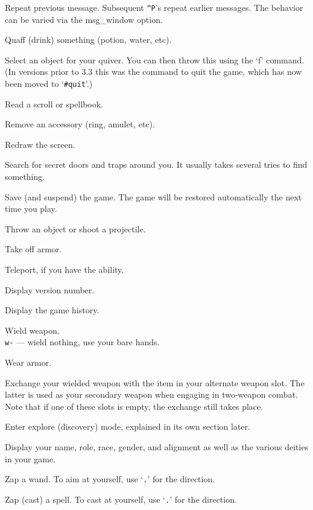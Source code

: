 \item[\tb{\^{}P}]
Repeat previous message.  Subsequent {\tt \^{}P}'s repeat earlier messages.
The behavior can be varied via the msg_window option.
\item[\tb{q}]
Quaff (drink) something (potion, water, etc).
\item[\tb{Q}]
Select an object for your quiver.  You can then throw this using
the `f' command.  (In versions prior to 3.3 this was the command to quit
the game, which has now been moved to `{\tt \#quit}'.)
\item[\tb{r}]
Read a scroll or spellbook.
\item[\tb{R}]
Remove an accessory (ring, amulet, etc).
\item[\tb{\^{}R}]
Redraw the screen.
\item[\tb{s}]
Search for secret doors and traps around you.  It usually takes several
tries to find something.
\item[\tb{S}]
Save (and suspend) the game.  The game will be restored automatically the
next time you play.
\item[\tb{t}]
Throw an object or shoot a projectile.
\item[\tb{T}]
Take off armor.
\item[\tb{\^{}T}]
Teleport, if you have the ability.
\item[\tb{v}]
Display version number.
\item[\tb{V}]
Display the game history.
\item[\tb{w}]
Wield weapon.\\
{\tt w-} --- wield nothing, use your bare hands.
\item[\tb{W}]
Wear armor.
\item[\tb{x}]
Exchange your wielded weapon with the item in your alternate
weapon slot.  The latter is used as your secondary weapon when engaging in
two-weapon combat.  Note that if one of these slots is empty,
the exchange still takes place.
\item[\tb{X}]
Enter explore (discovery) mode, explained in its own section later.
\item[\tb{\^{}X}]
Display your name, role, race, gender, and alignment as well as
the various deities in your game.
\item[\tb{z}]
Zap a wand.  To aim at yourself, use `{\tt .}' for the direction.
\item[\tb{Z}]
Zap (cast) a spell.  To cast at yourself, use `{\tt .}' for the direction.
